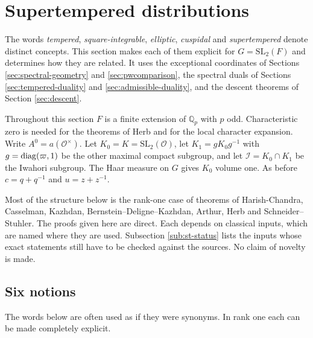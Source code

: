 \section{Supertempered distributions}\label{sec:supertemp}
The words \emph{tempered}, \emph{square-integrable}, \emph{elliptic}, \emph{cuspidal} and \emph{supertempered} denote distinct concepts. This section makes each of them explicit for $G=\mathrm{SL}_2(F)$ and determines how they are related. It uses the exceptional coordinates of Sections \ref{sec:spectral-geometry} and \ref{sec:pwcomparison}, the spectral duals of Sections \ref{sec:tempered-duality} and \ref{sec:admissible-duality}, and the descent theorems of Section \ref{sec:descent}.

Throughout this section $F$ is a finite extension of $\mathbb Q_p$ with $p$ odd. Characteristic zero is needed for the theorems of Herb and for the local character expansion. Write $A^0=a(\mathcal O^\times)$. Let $K_0=K=\mathrm{SL}_2(\mathcal O)$, let $K_1=gK_0g^{-1}$ with $g=\operatorname{diag}(\varpi,1)$ be the other maximal compact subgroup, and let $\mathcal I=K_0\cap K_1$ be the Iwahori subgroup. The Haar measure on $G$ gives $K_0$ volume one. As before $c=q+q^{-1}$ and $u=z+z^{-1}$.

Most of the structure below is the rank-one case of theorems of Harish-Chandra, Casselman, Kazhdan, Bernstein--Deligne--Kazhdan, Arthur, Herb and Schneider--Stuhler. The proofs given here are direct. Each depends on classical inputs, which are named where they are used. Subsection \ref{sub:st-status} lists the inputs whose exact statements still have to be checked against the sources. No claim of novelty is made.

\subsection{Six notions}\label{sub:six}
The words below are often used as if they were synonyms. In rank one each can be made completely explicit.

